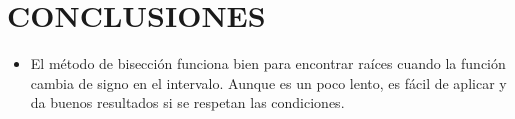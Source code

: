 \documentclass[12pt]{article}
\begin{document}
\vspace{0.5 cm}

\section*{CONCLUSIONES}
\begin{itemize}
    \item {El método de bisección funciona bien para encontrar raíces cuando la función cambia de signo en el intervalo.
     Aunque es un poco lento, es fácil de aplicar y da buenos resultados si se respetan las condiciones.}
\end{itemize}


\vspace{0.5cm}
\end{document}
